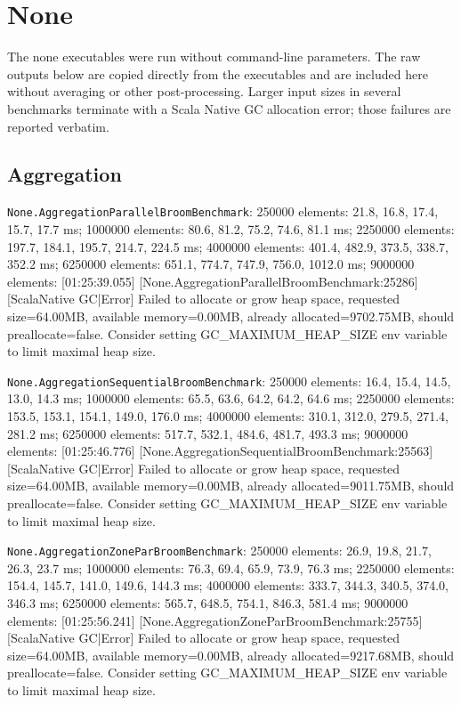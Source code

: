 \documentclass[
  english,   %
  bibtex,    %
]{kththesis}
\begin{document}
\section{None}

The none executables were run without command-line parameters. The raw outputs
below are copied directly from the executables and are included here without
averaging or other post-processing. Larger input sizes in several benchmarks
terminate with a Scala Native GC allocation error; those failures are reported
verbatim.

\subsection{Aggregation}

\texttt{None.AggregationParallelBroomBenchmark}: 250000 elements: 21.8, 16.8,
17.4, 15.7, 17.7 ms; 1000000 elements: 80.6, 81.2, 75.2, 74.6, 81.1 ms;
2250000 elements: 197.7, 184.1, 195.7, 214.7, 224.5 ms; 4000000 elements:
401.4, 482.9, 373.5, 338.7, 352.2 ms; 6250000 elements: 651.1, 774.7, 747.9,
756.0, 1012.0 ms; 9000000 elements: [01:25:39.055] [None.AggregationParallelBroomBenchmark:25286] [ScalaNative GC|Error] Failed to allocate or grow heap space, requested size=64.00MB, available memory=0.00MB, already allocated=9702.75MB, should preallocate=false. Consider setting GC_MAXIMUM_HEAP_SIZE env variable to limit maximal heap size.

\texttt{None.AggregationSequentialBroomBenchmark}: 250000 elements: 16.4, 15.4,
14.5, 13.0, 14.3 ms; 1000000 elements: 65.5, 63.6, 64.2, 64.2, 64.6 ms;
2250000 elements: 153.5, 153.1, 154.1, 149.0, 176.0 ms; 4000000 elements:
310.1, 312.0, 279.5, 271.4, 281.2 ms; 6250000 elements: 517.7, 532.1, 484.6,
481.7, 493.3 ms; 9000000 elements: [01:25:46.776] [None.AggregationSequentialBroomBenchmark:25563] [ScalaNative GC|Error] Failed to allocate or grow heap space, requested size=64.00MB, available memory=0.00MB, already allocated=9011.75MB, should preallocate=false. Consider setting GC_MAXIMUM_HEAP_SIZE env variable to limit maximal heap size.

\texttt{None.AggregationZoneParBroomBenchmark}: 250000 elements: 26.9, 19.8,
21.7, 26.3, 23.7 ms; 1000000 elements: 76.3, 69.4, 65.9, 73.9, 76.3 ms;
2250000 elements: 154.4, 145.7, 141.0, 149.6, 144.3 ms; 4000000 elements:
333.7, 344.3, 340.5, 374.0, 346.3 ms; 6250000 elements: 565.7, 648.5, 754.1,
846.3, 581.4 ms; 9000000 elements: [01:25:56.241] [None.AggregationZoneParBroomBenchmark:25755] [ScalaNative GC|Error] Failed to allocate or grow heap space, requested size=64.00MB, available memory=0.00MB, already allocated=9217.68MB, should preallocate=false. Consider setting GC_MAXIMUM_HEAP_SIZE env variable to limit maximal heap size.
\end{document}
